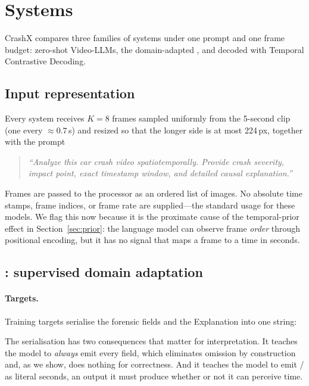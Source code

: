 \section{Systems}
\label{sec:method}

CrashX compares three families of systems under one prompt and one frame budget: zero-shot Video-LLMs, the domain-adapted \crashlogic{}, and \crashlogic{} decoded with Temporal Contrastive Decoding.

\subsection{Input representation}
\label{sec:input}
Every system receives $K{=}8$ frames sampled uniformly from the 5-second clip (one every $\approx0.7$\,s) and resized so that the longer side is at most 224\,px, together with the prompt
\begin{quote}\small
\emph{``Analyze this car crash video spatiotemporally. Provide crash severity, impact point, exact timestamp window, and detailed causal explanation.''}
\end{quote}
Frames are passed to the processor as an ordered list of images.
No absolute time stamps, frame indices, or frame rate are supplied---the standard usage for these models.
We flag this now because it is the proximate cause of the temporal-prior effect in Section~\ref{sec:prior}: the language model can observe frame \emph{order} through positional encoding, but it has no signal that maps a frame to a time in seconds.

\subsection{\crashlogic: supervised domain adaptation}
\label{sec:crashlogic}

\paragraph{Targets.}
Training targets serialise the forensic fields and the Explanation into one string:
\begin{quote}\small
{}
\end{quote}
The serialisation has two consequences that matter for interpretation.
It teaches the model to \emph{always} emit every field, which eliminates omission by construction and, as we show, does nothing for correctness.
And it teaches the model to emit / as literal seconds, an output it must produce whether or not it can perceive time.

